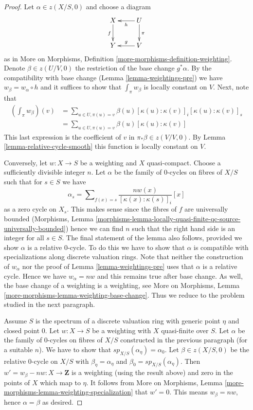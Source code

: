 \documentclass{stacks-project}
\theoremstyle{plain}
\theoremstyle{definition}
\theoremstyle{remark}
\numberwithin{equation}{subsection}
\begin{document}
\begin{proof}
Let $\alpha \in z(X/S, 0)$ and choose a diagram
$$
\xymatrix{
X \ar[d]_f & U \ar[l]^h \ar[d]^\pi \\
Y & V \ar[l]_g
}
$$
as in More on Morphisms, Definition \ref{more-morphisms-definition-weighting}.
Denote $\beta \in z(U/V, 0)$ the restriction of the base change $g^*\alpha$.
By the compatibility with base change (Lemma \ref{lemma-weightings-pre})
we have $w_\beta = w_\alpha \circ h$ and it suffices to show that
$\int_\pi w_\beta$ is locally constant on $V$. Next, note that
\begin{align*}
\left( \int_\pi w_\beta \right)(v)
& =
\sum\nolimits_{u \in U, \pi(u) = v} 
\beta(u) [\kappa(u) : \kappa(v)]_i [\kappa(u) : \kappa(v)]_s \\
& =
\sum\nolimits_{u \in U, \pi(u) = v} \beta(u)[\kappa(u) : \kappa(v)]
\end{align*}
This last expression is the coefficient of $v$ in $\pi_*\beta \in z(V/V, 0)$.
By Lemma \ref{lemma-relative-cycle-smooth} this function is locally
constant on $V$.

\medskip\noindent
Conversely, let $w : X \to S$ be a weighting and $X$ quasi-compact.
Choose a sufficiently divisible integer $n$. Let $\alpha$ be the family
of $0$-cycles on fibres of $X/S$ such that for $s \in S$ we have
$$
\alpha_s =
\sum\nolimits_{f(x) = s} \frac{n w(x)}{[\kappa(x) : \kappa(s)]_i} [x]
$$
as a zero cycle on $X_s$.
This makes sense since the fibres of $f$ are universally bounded
(Morphisms, Lemma
\ref{morphisms-lemma-locally-quasi-finite-qc-source-universally-bounded})
hence we can find $n$ such that the right hand side is an integer for
all $s \in S$. The final statement of the lemma also follows, provided
we show $\alpha$ is a relative $0$-cycle. To do this we have to
show that $\alpha$ is compatible with specializations along discrete
valuation rings. Note that neither the construction of $w_\alpha$
nor the proof of Lemma \ref{lemma-weightings-pre} uses that $\alpha$
is a relative cycle. Hence we have $w_\alpha = nw$ and this remains
true after base change. As well, the base change of a weighting
is a weighting, see
More on Morphisms, Lemma \ref{more-morphisms-lemma-weighting-base-change}.
Thus we reduce to the problem studied in the next paragraph.

\medskip\noindent
Assume $S$ is the spectrum of a discrete valuation ring with generic
point $\eta$ and closed point $0$. Let $w : X \to S$ be a weighting with
$X$ quasi-finite over $S$. Let $\alpha$ be the family of $0$-cycles on
fibres of $X/S$ constructed in the previous paragraph (for a suitable $n$).
We have to show that $sp_{X/S}(\alpha_\eta) = \alpha_0$.
Let $\beta \in z(X/S, 0)$ be the relative $0$-cycle on $X/S$
with $\beta_\eta = \alpha_\eta$ and $\beta_0 = sp_{X/S}(\alpha_\eta)$.
Then $w' = w_\beta - nw : X \to \mathbf{Z}$
is a weighting (using the result above) and zero in the points of $X$
which map to $\eta$. It follows from More on Morphisms,
Lemma \ref{more-morphisms-lemma-weighting-specialization}
that $w' = 0$. This means $w_\beta = nw$, hence $\alpha = \beta$ as desired.
\end{proof}
\end{document}
